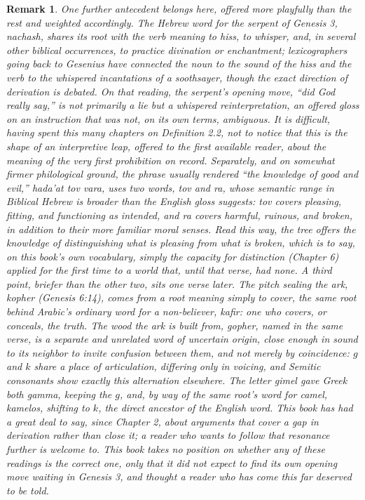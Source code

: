 \documentclass[11pt]{book}
\newtheorem*{appendixremark}{Remark}
\begin{document}
\begin{appendixremark}
One further antecedent belongs here, offered more playfully than the rest and weighted accordingly. The Hebrew word for the serpent of Genesis 3, \emph{nachash}, shares its root with the verb meaning to hiss, to whisper, and, in several other biblical occurrences, to practice divination or enchantment; lexicographers going back to Gesenius have connected the noun to the sound of the hiss and the verb to the whispered incantations of a soothsayer, though the exact direction of derivation is debated. On that reading, the serpent's opening move, ``did God really say,'' is not primarily a lie but a whispered reinterpretation, an offered gloss on an instruction that was not, on its own terms, ambiguous. It is difficult, having spent this many chapters on Definition 2.2, not to notice that this is the shape of an interpretive leap, offered to the first available reader, about the meaning of the very first prohibition on record. Separately, and on somewhat firmer philological ground, the phrase usually rendered ``the knowledge of good and evil,'' \emph{hada'at tov vara}, uses two words, \emph{tov} and \emph{ra}, whose semantic range in Biblical Hebrew is broader than the English gloss suggests: \emph{tov} covers pleasing, fitting, and functioning as intended, and \emph{ra} covers harmful, ruinous, and broken, in addition to their more familiar moral senses. Read this way, the tree offers the knowledge of \emph{distinguishing what is pleasing from what is broken}, which is to say, on this book's own vocabulary, simply the capacity for distinction (Chapter 6) applied for the first time to a world that, until that verse, had none. A third point, briefer than the other two, sits one verse later. The pitch sealing the ark, \emph{kopher} (Genesis 6:14), comes from a root meaning simply to cover, the same root behind Arabic's ordinary word for a non-believer, \emph{kafir}: one who covers, or conceals, the truth. The wood the ark is built from, \emph{gopher}, named in the same verse, is a separate and unrelated word of uncertain origin, close enough in sound to its neighbor to invite confusion between them, and not merely by coincidence: $g$ and $k$ share a place of articulation, differing only in voicing, and Semitic consonants show exactly this alternation elsewhere. The letter \emph{gimel} gave Greek both \emph{gamma}, keeping the $g$, and, by way of the same root's word for camel, \emph{kamelos}, shifting to $k$, the direct ancestor of the English word. This book has had a great deal to say, since Chapter 2, about arguments that cover a gap in derivation rather than close it; a reader who wants to follow that resonance further is welcome to. This book takes no position on whether any of these readings is the correct one, only that it did not expect to find its own opening move waiting in Genesis 3, and thought a reader who has come this far deserved to be told.
\end{appendixremark}
\end{document}
